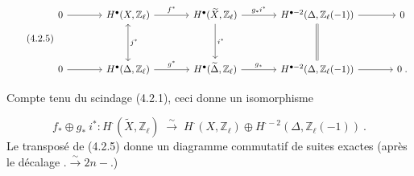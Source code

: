 \begin{equation}\tag{4.2.5}
\begin{tikzcd}[column sep=large, row sep=huge]
0 \arrow[r] & H^{\bullet}(X,\mathbb{Z}_{\ell}) \arrow[r, "f^{*}"] \arrow[d, leftrightarrow, "j^{*}"] & H^{\bullet}(\widetilde{X},\mathbb{Z}_{\ell}) \arrow[r, "g_{*}i^{*}"] \arrow[d, "i^{*}"] & H^{\bullet-2}(\Delta,\mathbb{Z}_{\ell}(-1)) \arrow[r] \arrow[d, Rightarrow, no head] & 0 \\
0 \arrow[r] & H^{\bullet}(\Delta,\mathbb{Z}_{\ell}) \arrow[r, "g^{*}"] & H^{\bullet}(\widetilde{\Delta},\mathbb{Z}_{\ell}) \arrow[r, "g_{*}"] & H^{\bullet-2}(\Delta,\mathbb{Z}_{\ell}(-1)) \arrow[r] & 0\;.
\end{tikzcd}
\end{equation}


Compte tenu du scindage (4.2.1), ceci donne un isomorphisme

\begin{equation}\tag{4.2.6}
f_* \oplus g_* \ i^* : H^{\cdot}(\widetilde{X},\mathbb{Z}_\ell) \;\stackrel{\sim}{\longrightarrow}\; H^{\cdot}(X,\mathbb{Z}_\ell) \oplus H^{\cdot-2}(\Delta,\mathbb{Z}_\ell(-1)) \ .
\end{equation}
Le transposé de (4.2.5) donne un diagramme commutatif de suites exactes (après le décalage $. \stackrel{\sim}{\longrightarrow} 2n-.$)

